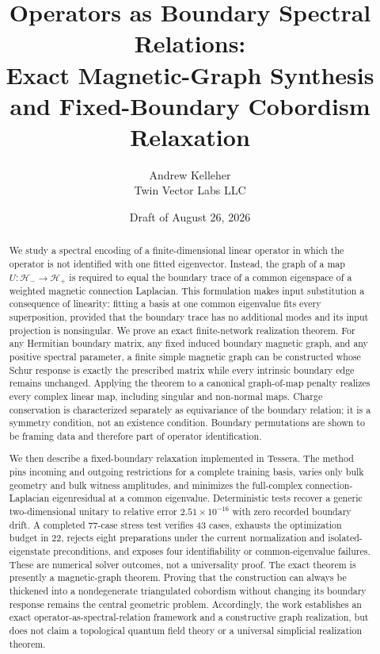 \documentclass[11pt]{article}
\title{Operators as Boundary Spectral Relations:\\
Exact Magnetic-Graph Synthesis and Fixed-Boundary Cobordism Relaxation}
\author{Andrew Kelleher\\Twin Vector Labs LLC}
\date{Draft of August 26, 2026}
\numberwithin{equation}{section}
\theoremstyle{definition}
\theoremstyle{remark}
\begin{document}
\maketitle

\begin{abstract}
We study a spectral encoding of a finite-dimensional linear operator in which the
operator is not identified with one fitted eigenvector.  Instead, the graph of a
map $U:\mathcal H_-\to\mathcal H_+$ is required to equal the boundary trace of a
common eigenspace of a weighted magnetic connection Laplacian.  This formulation
makes input substitution a consequence of linearity: fitting a basis at one
common eigenvalue fits every superposition, provided that the boundary trace has
no additional modes and its input projection is nonsingular.  We prove an exact
finite-network realization theorem.  For any Hermitian boundary matrix, any
fixed induced boundary magnetic graph, and any positive spectral parameter, a
finite simple magnetic graph can be constructed whose Schur response is exactly
the prescribed matrix while every intrinsic boundary edge remains unchanged.
Applying the theorem to a canonical graph-of-map penalty realizes every complex
linear map, including singular and non-normal maps.  Charge conservation is
characterized separately as equivariance of the boundary relation; it is a
symmetry condition, not an existence condition.  Boundary permutations are
shown to be framing data and therefore part of operator identification.

We then describe a fixed-boundary relaxation implemented in Tessera.  The method
pins incoming and outgoing restrictions for a complete training basis, varies
only bulk geometry and bulk witness amplitudes, and minimizes the full-complex
connection-Laplacian eigenresidual at a common eigenvalue.  Deterministic tests
recover a generic two-dimensional unitary to relative error
$2.51\times10^{-16}$ with zero recorded boundary drift.  A completed 77-case
stress test verifies 43 cases, exhausts the optimization budget in 22, rejects
eight preparations under the current normalization and isolated-eigenstate
preconditions, and exposes four identifiability or
common-eigenvalue failures.  These are numerical solver outcomes, not a
universality proof.  The exact theorem is presently a magnetic-graph theorem.
Proving that the construction can always be thickened into a nondegenerate
triangulated cobordism without changing its boundary response remains the
central geometric problem.  Accordingly, the work establishes an exact
operator-as-spectral-relation framework and a constructive graph realization,
but does not claim a topological quantum field theory or a universal simplicial
realization theorem.
\end{abstract}
\end{document}

